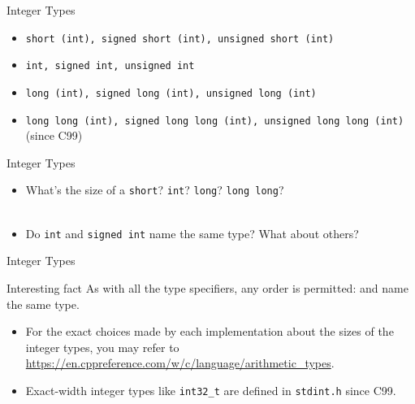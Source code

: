 \documentclass[handout]{beamer}
\begin{document}
\begin{frame}{Integer Types}
    \begin{itemize}
        \item \texttt{short (int), signed short (int), unsigned short (int)}
        \item \texttt{int, signed int, unsigned int}
        \item \texttt{long (int), signed long (int), unsigned long (int)}
        \item \texttt{long long (int), signed long long (int), unsigned long long (int)} (since C99)
    \end{itemize}
\end{frame}

\begin{frame}{Integer Types}
    \begin{itemize}
        \item What's the size of a \texttt{short}? \texttt{int}? \texttt{long}? \texttt{long long}?\\
        \pause
        \\
        \pause
        \item Do \texttt{int} and \texttt{signed int} name the same type? What about others?
        \pause
    \end{itemize}
\end{frame}

\begin{frame}{Integer Types}
    \begin{alertblock}{Interesting fact}
        As with all the type specifiers, any order is permitted:  and  name the same type.
    \end{alertblock}
    \pause
    \begin{itemize}
        \item For the exact choices made by each implementation about the sizes of the integer types, you may refer to \url{https://en.cppreference.com/w/c/language/arithmetic_types}.
        \pause
        \item Exact-width integer types like \texttt{int32\_t} are defined in \texttt{stdint.h} since C99.
    \end{itemize}
\end{frame}
\end{document}
